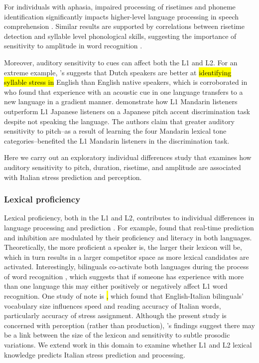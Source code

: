 For individuals with aphasia, impaired processing of risetimes and phoneme identification significantly impacts higher-level language processing in speech comprehension \citep{Kries2023}. Similar results are supported by correlations between risetime detection and syllable level phonological skills, suggesting the importance of sensitivity to amplitude in word recognition \citep{Hamalaine2005}. 

Moreover, auditory sensitivity to cues can affect both the L1 and L2. For an extreme example, \cite{cutler2007dutch}'s suggests that Dutch speakers are better at \hl{identifying syllable stress in} English than English native speakers, which is corroborated in \cite{Pajak2014} who found that experience with an acoustic cue in one language transfers to a new language in a gradient manner. \cite{wienergoss} demonstrate how L1 Mandarin listeners outperform L1 Japanese listeners on a Japanese pitch accent discrimination task despite not speaking the language. The authors claim that greater auditory sensitivity to pitch--as a result of learning the four Mandarin lexical tone categories--benefited the L1 Mandarin listeners in the discrimination task. 

Here we carry out an exploratory individual differences study that examines how auditory sensitivity to pitch, duration, risetime, and amplitude are associated with Italian stress prediction and perception.

\subsubsection{Lexical proficiency}
Lexical proficiency, both in the L1 and L2, contributes to individual differences in language processing and prediction \citep{Diependaele2013, Yap2012}. For example, \cite{Kukona2016} found that real-time prediction and inhibition are modulated by their proficiency and literacy in both languages. Theoretically, the more proficient a speaker is, the larger their lexicon will be, which in turn results in a larger competitor space as more lexical candidates are activated. Interestingly, bilinguals co-activate both languages during the process of word recognition \citep{kroll1997lexical, dijkstra2002architecture, marian2003competing}, which suggests that if someone has experience with more than one language this may either positively or negatively affect L1 word recognition. One study of note is \cite{primativo2013bilingual}\hl{,} which found that English-Italian bilinguals' vocabulary size influences speed and reading accuracy of Italian words, particularly accuracy of stress assignment. Although the present study is concerned with perception (rather than production), \cite{primativo2013bilingual}'s findings suggest there may be a link between the size of the lexicon and sensitivity to subtle prosodic variations. We extend work in this domain to examine whether L1 and L2 lexical knowledge predicts Italian stress prediction and processing.

